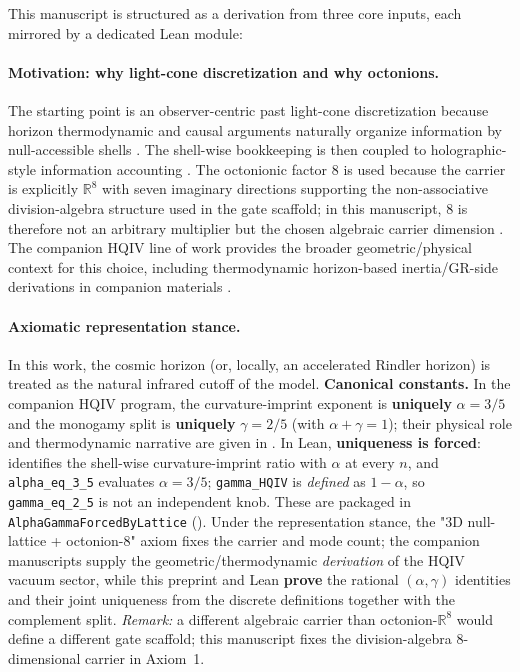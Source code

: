 \documentclass[11pt,a4paper]{article}
\newcommand{\lean}[1]{\path{#1}}
\theoremstyle{remark}
\begin{document}
This manuscript is structured as a derivation from three core inputs, each mirrored by a dedicated Lean module:

\paragraph{Motivation: why light-cone discretization and why octonions.}
The starting point is an observer-centric past light-cone discretization because horizon thermodynamic and causal arguments naturally organize information by null-accessible shells \cite{jacobson1995,bombelli1987}. The shell-wise bookkeeping is then coupled to holographic-style information accounting \cite{susskind1994,bousso2002}. The octonionic factor $8$ is used because the carrier is explicitly $\mathbb{R}^8$ with seven imaginary directions supporting the non-associative division-algebra structure used in the gate scaffold; in this manuscript, $8$ is therefore not an arbitrary multiplier but the chosen algebraic carrier dimension \cite{baez2002octonions,freedman2019}. The companion HQIV line of work provides the broader geometric/physical context for this choice, including thermodynamic horizon-based inertia/GR-side derivations in companion materials \cite{ettinger2026hqiv,brodie2026}.

\paragraph{Axiomatic representation stance.}
In this work, the cosmic horizon (or, locally, an accelerated Rindler horizon) is treated as the natural infrared cutoff of the model. \textbf{Canonical constants.} In the companion HQIV program, the curvature-imprint exponent is \textbf{uniquely} $\alpha=3/5$ and the monogamy split is \textbf{uniquely} $\gamma=2/5$ (with $\alpha+\gamma=1$); their physical role and thermodynamic narrative are given in \cite{ettinger2026hqiv,brodie2026}. In Lean, \textbf{uniqueness is forced}: \lean{latticeAlphaRatio_eq_alpha} identifies the shell-wise curvature-imprint ratio with $\alpha$ at every $n$, and \texttt{alpha\_eq\_3\_5} evaluates $\alpha=3/5$; \texttt{gamma\_HQIV} is \emph{defined} as $1-\alpha$, so \texttt{gamma\_eq\_2\_5} is not an independent knob. These are packaged in \texttt{AlphaGammaForcedByLattice} (\lean{alpha_gamma_forced_pair}). Under the representation stance, the "$3$D null-lattice + octonion-$8$" axiom fixes the carrier and mode count; the companion manuscripts supply the geometric/thermodynamic \emph{derivation} of the HQIV vacuum sector, while this preprint and Lean \textbf{prove} the rational $(\alpha,\gamma)$ identities and their joint uniqueness from the discrete definitions together with the complement split. \emph{Remark:} a different algebraic carrier than octonion-$\mathbb{R}^8$ would define a different gate scaffold; this manuscript fixes the division-algebra $8$-dimensional carrier in Axiom~1.
\end{document}

